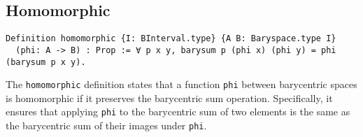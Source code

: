 \documentclass[a4paper,10pt]{article} %
\begin{document}
\subsection{Homomorphic}

\begin{lstlisting}
Definition homomorphic {I: BInterval.type} {A B: Baryspace.type I}
  (phi: A -> B) : Prop := ∀ p x y, barysum p (phi x) (phi y) = phi (barysum p x y).
\end{lstlisting}
The \texttt{homomorphic} definition states that a function \texttt{phi} between barycentric spaces is homomorphic if it preserves the barycentric sum operation. Specifically, it ensures that applying \texttt{phi} to the barycentric sum of two elements is the same as the barycentric sum of their images under \texttt{phi}.








\end{document}

